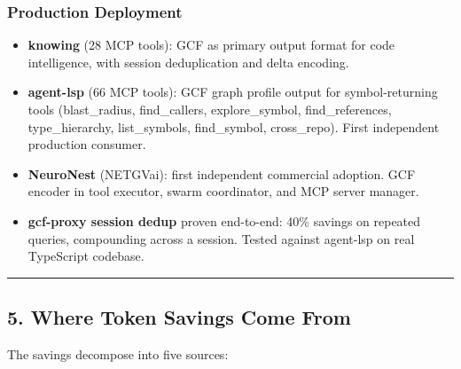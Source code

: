 \documentclass[
  11pt,
  paper=a4,
  ,captions=tableheading
]{scrartcl}
\providecommand{\tightlist}{%
  \setlength{\itemsep}{0pt}\setlength{\parskip}{0pt}}
\begin{document}
\subsubsection{Production Deployment}\label{production-deployment}

\begin{itemize}
\tightlist
\item
  \textbf{knowing} (28 MCP tools): GCF as primary output format for code
  intelligence, with session deduplication and delta encoding.
\item
  \textbf{agent-lsp} (66 MCP tools): GCF graph profile output for
  symbol-returning tools (blast\_radius, find\_callers, explore\_symbol,
  find\_references, type\_hierarchy, list\_symbols, find\_symbol,
  cross\_repo). First independent production consumer.
\item
  \textbf{NeuroNest} (NETGVai): first independent commercial adoption.
  GCF encoder in tool executor, swarm coordinator, and MCP server
  manager.
\item
  \textbf{gcf-proxy session dedup} proven end-to-end: 40\% savings on
  repeated queries, compounding across a session. Tested against
  agent-lsp on real TypeScript codebase.
\end{itemize}

\begin{center}\rule{0.5\linewidth}{0.5pt}\end{center}

\subsection{5. Where Token Savings Come
From}\label{where-token-savings-come-from}

The savings decompose into five sources:
\end{document}
